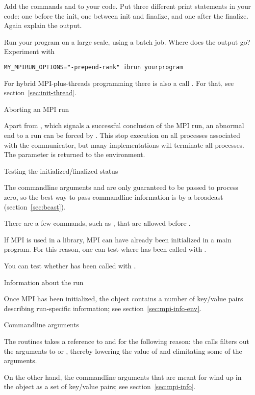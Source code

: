 \begin{exercise}
  \label{ex:hello2}
  Add the commands  and 
  to your code. Put three different print statements in your code: one before the init,
  one between init and finalize, and one after the finalize. Again explain the output.

  Run your program on a large scale, using a batch job.
  Where does the output go?
  Experiment with
\begin{verbatim}
MY_MPIRUN_OPTIONS="-prepend-rank" ibrun yourprogram
\end{verbatim}
\end{exercise}

\begin{remark}
  For hybrid MPI-plus-threads programming there is also a call
  . For that, see
  section~\ref{sec:init-thread}.
\end{remark}

 {Aborting an MPI run}

Apart from , which signals a successful
conclusion of the MPI run, an abnormal end to a run can be forced by
.
%
This stop execution on all processes associated with the communicator,
but many implementations will terminate all processes. The  parameter
is returned to the environment.

 {Testing the initialized/finalized status}

The commandline arguments  and  are only guaranteed to
be passed to process zero, so the best way to pass commandline information
is by a broadcast (section~\ref{sec:bcast}).

There are a few commands, such as
, that are allowed before
.

If MPI is used in a library, MPI can have already been initialized in a main program.
For this reason, one can test where  has been called with
%
.

You can test whether  has been called with
%
.

 {Information about the run}

Once MPI has been initialized, the  object
contains a number of key/value pairs describing run-specific
information; see section~\ref{sec:mpi-info-env}.

 {Commandline arguments}

The  routines takes a reference to 
and  for the following reason: the  calls
filters out the arguments to  or ,
thereby lowering the value of  and elimitating some of the 
arguments.

On the other hand, the commandline arguments that are meant for 
wind up in the  object as a set of
key/value pairs; see section~\ref{sec:mpi-info}.

